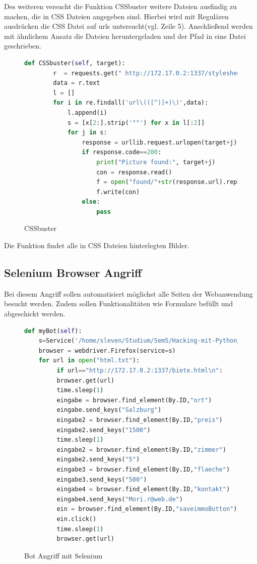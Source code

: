 \documentclass[12pt]{article}
\begin{document}
Des weiteren versucht die Funktion CSSbuster weitere Dateien ausfindig zu machen, die in CSS Dateien angegeben sind. Hierbei wird mit Regulären ausdrücken die CSS Datei auf urls untersucht(vgl. Zeile 5). Anschließend werden mit ähnlichem Ansatz die Dateien heruntergeladen und der Pfad in eine Datei geschrieben.
\begin{figure}[h]
 \caption{CSSbuster}
 \begin{lstlisting}[language=python, style=code, basicstyle=\scriptsize]
 def CSSbuster(self, target):
 		r  = requests.get(" http://172.17.0.2:1337/stylesheet.css")
 		data = r.text
 		l = []
 		for i in re.findall('url\(([^)]+)\)',data):
	 		l.append(i)
	 		s = [x[2:].strip('""') for x in l[:2]]
	 		for j in s:
		 		response = urllib.request.urlopen(target+j)
		 		if response.code==200:
			 		print("Picture found:", target+j)
			 		con = response.read()
			 		f = open("found/"+str(response.url).replace("/",""), 'wb+')
			 		f.write(con)
				else:
					pass
 \end{lstlisting}
\end{figure}

Die Funktion findet alle in CSS Dateien hinterlegten Bilder.
\newpage
\subsection{Selenium Browser Angriff}
Bei diesem Angriff sollen automatisiert möglichst alle Seiten der Webanwendung besucht werden. Zudem sollen Funktionalitäten wie Formulare befüllt und abgeschickt werden.
\begin{figure}[h]
\caption{Bot Angriff mit Selenium}
 \begin{lstlisting}[language=python, style=code]
 def myBot(self):
 	s=Service('/home/sleven/Studium/Sem5/Hacking-mit-Python/geckodriver')
 	browser = webdriver.Firefox(service=s)
 	for url in open("html.txt"):
		 if url=="http://172.17.0.2:1337/biete.html\n":
		 browser.get(url)
		 time.sleep(1)
		 eingabe = browser.find_element(By.ID,"ort")
		 eingabe.send_keys("Salzburg")
		 eingabe2 = browser.find_element(By.ID,"preis")
		 eingabe2.send_keys("1500")
		 time.sleep(1)
		 eingabe2 = browser.find_element(By.ID,"zimmer")
		 eingabe2.send_keys("5")
		 eingabe3 = browser.find_element(By.ID,"flaeche")
		 eingabe3.send_keys("500")
		 eingabe4 = browser.find_element(By.ID,"kontakt")
		 eingabe4.send_keys("Mori.r@web.de")
		 ein = browser.find_element(By.ID,"saveimmoButton")
		 ein.click()
		 time.sleep(1)
		 browser.get(url)
 \end{lstlisting}

\end{figure}
\end{document}
